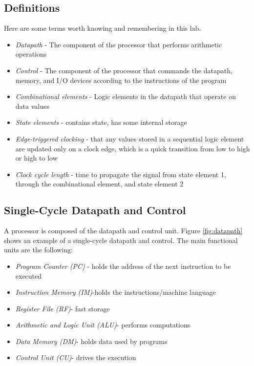 \documentclass[a4paper, 11pt,oneside]{article}
\begin{document}
\subsection{Definitions}
Here are some terms worth knowing and remembering in this lab.

\begin{itemize}
	\item{\textit{Datapath} - The component of the processor that performs arithmetic operations}

	\item{\textit{Control} - The component of the processor that commands the datapath, memory, and I/O devices according to the instructions of the program}

	\item{\textit{Combinational elements} - Logic elements in the datapath that operate on data values}

	\item{\textit{State elements} - contains state, has some internal storage}

	\item{\textit{Edge-triggered clocking} - that any values stored in a sequential logic element are updated only on a clock edge, which is a quick transition from low to high or high to low}

	\item{\textit{Clock cycle length} - time to propagate the signal from state element 1, through the combinational element, and state element 2}

\end{itemize}

\subsection{Single-Cycle Datapath and Control}
A processor is composed of the datapath and control unit. Figure \ref{fig:datapath} shows an example of a 
single-cycle datapath and control. The main functional units are the following:
\begin{itemize}
	\item{\textit{Program Counter (PC)} - holds the address of the next instruction to be executed}
	\item{\textit{Instruction Memory (IM)}-holds the instructions/machine language}
	\item{\textit{Register File (RF)}- fast storage}
	\item{\textit{Arithmetic and Logic Unit (ALU)}- performs computations}
	\item{\textit{Data Memory (DM)}- holds data used by programs}
	\item{\textit{Control Unit (CU)}- drives the execution }
\end{itemize}
\end{document}
